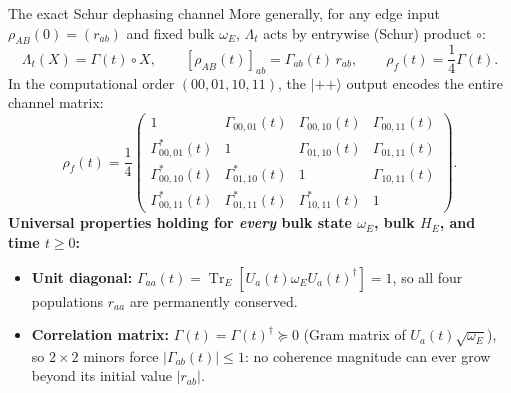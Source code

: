 \documentclass[aspectratio=169,11pt]{beamer}
\newcommand{\ket}[1]{\lvert #1\rangle}
\newcommand{\Tr}{\operatorname{Tr}}
\begin{document}
\begin{frame}{The exact Schur dephasing channel}
\small
More generally, for any edge input $\rho_{AB}(0)=(r_{ab})$ and fixed bulk $\omega_E$, $\Lambda_t$ acts by entrywise (Schur) product $\circ$:
\[
\boxed{\Lambda_t(X)=\Gamma(t)\circ X,\qquad
[\rho_{AB}(t)]_{ab}=\Gamma_{ab}(t)\,r_{ab},\qquad
\rho_f(t)=\frac14\Gamma(t).}
\]
In the computational order $(00,01,10,11)$, the $\ket{++}$ output encodes the entire channel matrix:
\[
\rho_f(t)=\frac14\begin{pmatrix}
1 & \Gamma_{00,01}(t) & \Gamma_{00,10}(t) & \Gamma_{00,11}(t)\\[1pt]
\Gamma_{00,01}^*(t) & 1 & \Gamma_{01,10}(t) & \Gamma_{01,11}(t)\\[1pt]
\Gamma_{00,10}^*(t) & \Gamma_{01,10}^*(t) & 1 & \Gamma_{10,11}(t)\\[1pt]
\Gamma_{00,11}^*(t) & \Gamma_{01,11}^*(t) & \Gamma_{10,11}^*(t) & 1
\end{pmatrix}.
\]
\textbf{Universal properties holding for \emph{every} bulk state $\omega_E$, bulk $H_E$, and time $t\ge0$:}
\begin{itemize}\setlength\itemsep{3pt}
\item \textbf{Unit diagonal:} $\Gamma_{aa}(t)=\Tr_E[U_a(t)\omega_EU_a(t)^\dagger]=1$, so all four populations $r_{aa}$ are permanently conserved.
\item \textbf{Correlation matrix:} $\Gamma(t)=\Gamma(t)^\dagger\succeq0$ (Gram matrix of $U_a(t)\sqrt{\omega_E}$), so $2\times2$ minors force $\lvert\Gamma_{ab}(t)\rvert\le1$: no coherence magnitude can ever grow beyond its initial value $\lvert r_{ab}\rvert$.
\end{itemize}
\end{frame}
\end{document}

